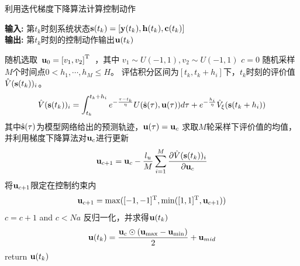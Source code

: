 \begin{algorithm}[htb]
\caption{利用迭代梯度下降算法计算控制动作} %
\label{alg:find_optimal_policy}
\hspace*{0.02in} {\bf 输入:} %
第$t_k$时刻系统状态$\mathbf s(t_k)=[\mathbf y(t_k),\mathbf h(t_k),\mathbf c(t_k)]$\\
\hspace*{0.02in} {\bf 输出:} %
第$t_k$时刻的控制动作输出${\mathbf u}(t_k)$
\begin{algorithmic}[1]
\State 随机选取$
\begin{array}{c}{\mathbf u_{0}=\left[v_{1}, v_{2}\right]^{\rm T}} \end{array}
$，其中 $v_{1} \sim U(-1,1) , v_{2} \sim U(-1,1)$ 
\State $c=0$
  \Do
    \State 随机采样$M$个时间点$0 < h_1, \cdots, h_M \leq H$。
    \State 评估积分区间为$[t_k,t_k+h_i]$下，$t_k$时刻的评价值$\hat{V}(\mathbf s(t_k))_i$。
    \begin{equation}
    \hat{V}(\mathbf s(t_k))_i = \int_{t_k}^{t_k+h_i}e^{-\frac{\tau-t_k}{\eta}}U(\hat{\mathbf s}(\tau),{\mathbf u}(\tau))d\tau+e^{-\frac{h_i}{\eta}}\hat{V}_\xi(\mathbf s(t_k+h_i)) 
    \label{equ:estimate_J_next}
    \end{equation}
    其中$\hat{\mathbf s}(\tau)$为模型网络给出的预测轨迹，$\mathbf u(\tau)=\mathbf u _c$
\EndFor
\State 求取$M$轮采样下评价值的均值，并利用梯度下降算法对$\mathbf u_c$进行更新
\begin{equation}
\mathbf u_{c+1}=\mathbf u_c- \frac{l_u}{M}\sum_{i=1}^{M}\frac{\partial \hat{V}(\mathbf s(t_k))_i}{\partial \mathbf u_{c}}
\end{equation}
\State 将$\mathbf u_{c+1}$限定在控制约束内
\begin{equation}
\mathbf u_{c+1} = \max([-1,-1]^{\rm T}, \min([1,1]^{\rm T},\mathbf u_{c+1}))
\end{equation}
\State $c=c+1$
   and $c<Na$ %
  \State 反归一化，并求得${\mathbf u}(t_k)$
 \begin{equation}
\mathbf u(t_k)=\frac{\mathbf u_{c} \odot\left(\mathbf u_{\max }-\mathbf u_{\min
}\right)}{2}+\mathbf u_{mid }
\end{equation}
\State return $\mathbf u(t_k)$
\end{algorithmic}

\end{algorithm}

